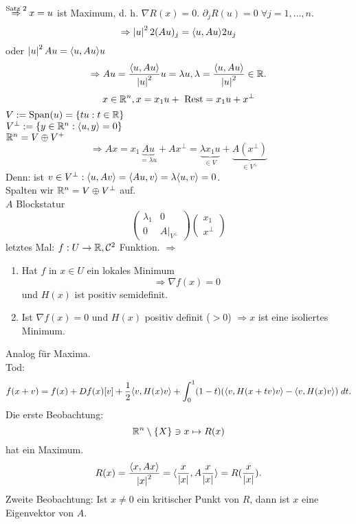 \documentclass[../ana2.tex]{subfiles}
\begin{document}
\( \oversett{Satz 2}{\Rightarrow} x=u \) ist Maximum, d. h. \( \nabla R(x) = 0 \).
\( \partial_j R(u) = 0 \;\forall j = 1,\ldots,n \).
\[ \Rightarrow \abs{u}^2 2(Au)_j = \scalarprod{u}{Au}2u_j \]
oder \( \abs{u}^2 Au = \scalarprod{u}{Au} u \)
\[ \Rightarrow Au = \frac{\scalarprod{u}{Au}}{\abs{u}^2}u = \lambda u, 
\lambda = \frac{\scalarprod{u}{Au}}{\abs{u}^2} \in \R. \]
\[ x \in \R^n, x = x_1 u + \text{ Rest} = x_1 u + x^\bot \]
\(V := \mathrm{Span}(u) = \set{tu : t \in \R}\)\\
\( V^\bot := \set{y \in \R^n: \scalarprod{u}{y} = 0} \)\\
\( \R^n = V \oplus V^+ \)
\[ \Rightarrow Ax = x_1\underbrace{Au}_{=\lambda u} + Ax^\bot 
= \underbrace{\lambda x_1 u}_{\in V} 
+ \underbrace{A(x^\bot)}_{\in V^\bot} \]
Denn: ist \( v \in V^\bot: \scalarprod{u}{Av} = \scalarprod{Au}{v} 
= \lambda \scalarprod{u}{v} = 0 \).\\
Spalten wir \( \R^n = V \oplus V^\bot \) auf.\\
\( A \) Blockstatur \gqq{\(=\)} 
\[ \begin{pmatrix} \lambda_1 & 0\\ 0 & A\vert_{V^\bot} \end{pmatrix} 
\begin{pmatrix} x_1 \\ x^\bot \end{pmatrix} \]
letztes Mal: \( \abb{f}{U}{\R}, \mathcal{C}^2 \) Funktion.
\(\Rightarrow\)
\begin{enumerate}
    \item Hat \(f\) in \(x \in U\) ein lokales Minimum
    \[ \Rightarrow \nabla f(x) = 0 \] 
    und \(H(x)\) ist positiv semidefinit.
    \item Ist \( \nabla f(x) = 0 \) 
    und \(H(x)\) positiv definit (\(> 0\))
    \( \Rightarrow x \) ist eine isoliertes Minimum.
\end{enumerate}
Analog für Maxima.\\
Tod: 
\[ f(x + v) = f(x) + Df(x)[v] + \frac{1}{2} \scalarprod{v}{H(x)v} 
+ \integralx{ (1 - t) (\scalarprod{v}{H(x + tv)v} 
- \scalarprod{v}{H(x)v}) }{0}{1}{t}. \]
Die erste Beobachtung:
\[ \R^n \setminus \set{X} \ni x \mapsto R(x) \]
hat ein Maximum.
\[ R(x) = \frac{\scalarprod{x}{Ax}}{\abs{x}^2} 
= \scalarprod{\frac{x}{\abs{x}}}{A\frac{x}{\abs{x}}} = R(\frac{x}{\abs{x}}). \]
Zweite Beobachtung:
Ist \(x \neq 0\) ein kritischer Punkt von \(R\), dann ist 
\(x\) eine Eigenvektor von \(A\).
\end{document}
